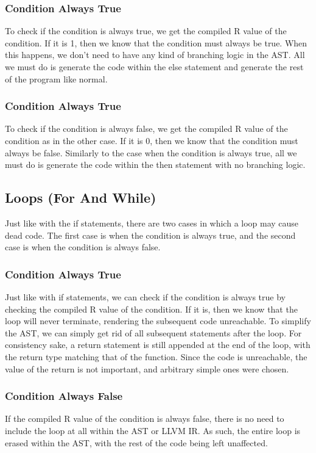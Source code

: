 \documentclass[sigconf]{acmart}
\begin{document}
\subsubsection{Condition Always True}
To check if the condition is always true, we get the compiled R value of the condition. If it is 1, then we know that 
the condition must always be true. When this happens, we don't need to have any kind of branching logic in the AST.
All we must do is generate the code within the else statement and generate the rest of the program like normal. 

\subsubsection{Condition Always True}
To check if the condition is always false, we get the compiled R value of the condition as in the other case. If it is 0, then we know that 
the condition must always be false. Similarly to the case when the condition is always true, all we must do is generate the code within 
the then statement with no branching logic. 

\subsection{Loops (For And While)}
Just like with the if statements, there are two cases in which a loop may cause dead code. The first case is when the condition 
is always true, and the second case is when the condition is always false.

\subsubsection{Condition Always True}
Just like with if statements, we can check if the condition is always true by checking the compiled R value of the condition.
If it is, then we know that the loop will never terminate, rendering the subsequent code unreachable. To simplify the AST, we can 
simply get rid of all subsequent statements after the loop. For consistency sake, a return statement is still appended at the end of the loop,
with the return type matching that of the function. Since the code is unreachable, the value of the return is not important, and arbitrary simple 
ones were chosen.

\subsubsection{Condition Always False}
If the compiled R value of the condition is always false, there is no need to include the loop at all within the AST or LLVM IR. 
As such, the entire loop is erased within the AST, with the rest of the code being left unaffected.
\end{document}
